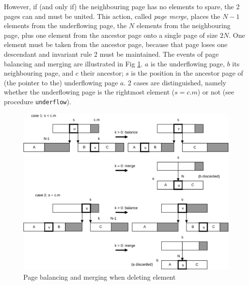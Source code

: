 However, if (and only if) the neighbouring page has no elements to spare, the 2 pages can and must be
united. This action, called \emph{page merge}, places the $N-1$ elements from the underflowing page,
the $N$ elements from the neighbouring page, plus one element from the ancestor page onto a single page
of size $2N$. One element must be taken from the ancestor page, because that page loses one descendant
and invariant rule 2 must be maintained. The events of page balancing and merging are illustrated in
Fig \ref{fig:page-merge}.  $a$ is the underflowing page, $b$ its neighbouring page, and $c$ their
ancestor; $s$ is the position in the ancestor page of (the pointer to the) underflowing page $a$.  2
cases are distinguished, namely whether the underflowing page is the rightmost element ($s = c.m$)
or not (see procedure \verb|underflow|).
\begin{figure}
  \centering
  \includegraphics[width=.95\textwidth]{i/p}
  \caption{Page balancing and merging when deleting element}
  \label{fig:page-merge}
\end{figure}

